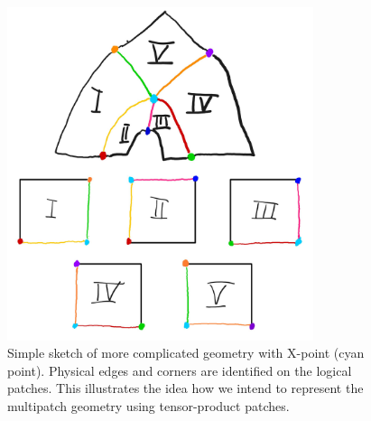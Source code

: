 \documentclass[presentation.tex]{subfiles}
\begin{document}
\begin{figure}
	\centering
	\includegraphics*[width=0.8\textwidth]{images/5patches_sketch.jpg}
	\caption{\label{Complex_geometry_1}
	          Simple sketch of more complicated geometry with X-point (cyan point). 
			  Physical edges and corners are identified on the logical patches.
			  This illustrates the idea how we intend to represent the multipatch geometry 
			  using tensor-product patches.}
\end{figure}
\end{document}

